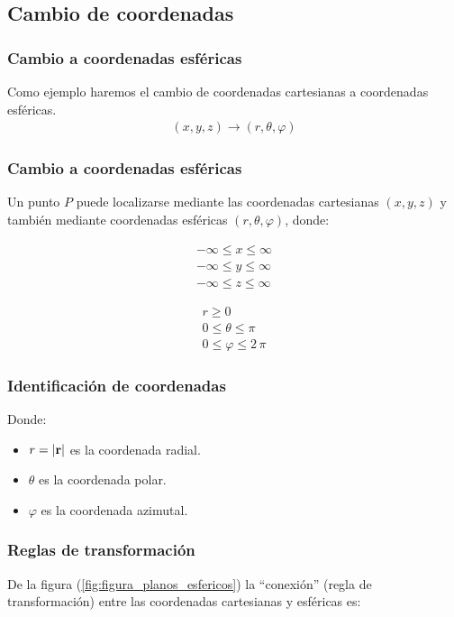 \documentclass[12pt]{beamer}
\begin{document}
\subsection{Cambio de coordenadas}

\begin{frame}
\frametitle{Cambio a coordenadas esféricas}
Como ejemplo haremos el cambio de coordenadas cartesianas a coordenadas esféricas.
\begin{align*}
(x, y, z) \longrightarrow (r, \theta, \varphi)
\end{align*}
\end{frame}
\begin{frame}
\frametitle{Cambio a coordenadas esféricas}
Un punto $P$ puede localizarse mediante las coordenadas cartesianas $(x, y, z)$ y también mediante coordenadas esféricas $(r, \theta, \varphi)$, donde:
\pause
\begin{minipage}{0.4\linewidth}
\begin{align*}
-\infty \le x \le \infty \\
-\infty \le y \le \infty \\
-\infty \le z \le \infty
\end{align*}
\end{minipage}
\hspace{0.3cm}
\begin{minipage}{0.4\linewidth}
\begin{align*}
r \geq 0 \\
0 \le \theta \le \pi \\
0 \le \varphi \le 2 \, \pi
\end{align*}
\end{minipage}
\end{frame}
\begin{frame}
\frametitle{Identificación de coordenadas}
Donde:
\pause
\begin{itemize}
\item[\ding{212}] $r = \abs{\vb{r}}$ es la coordenada radial.
\item[\ding{212}] $\theta$ es la coordenada polar.
\item[\ding{212}] $\varphi$ es la coordenada azimutal.
\end{itemize}
\end{frame}
\begin{frame}
\frametitle{Reglas de transformación}
De la figura (\ref{fig:figura_planos_esfericos}) la \enquote{conexión} (regla de transformación)  entre las coordenadas cartesianas y esféricas es:
\end{frame}
\end{document}
